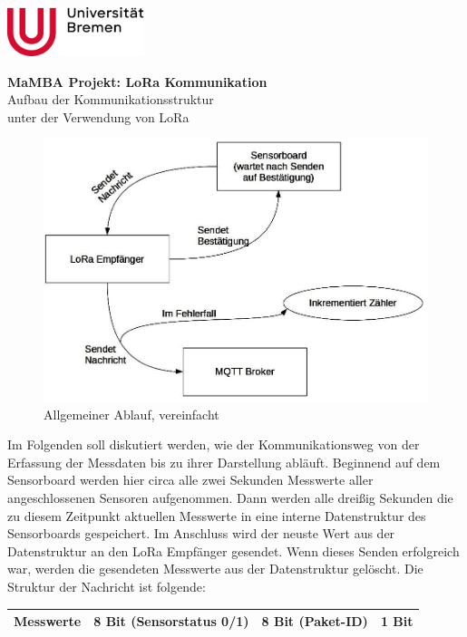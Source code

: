 \documentclass[a4paper, 12pt]{article}
\begin{document}
\begin{multicols}{2}
\includegraphics[width=0.3\textwidth]{bilder/Uni-Bremen_Logo.png}
\\
\end{multicols}
\begin{center}
{\LARGE\bfseries MaMBA Projekt: LoRa Kommunikation}
\\
{\Large Aufbau der Kommunikationsstruktur\\unter der Verwendung von LoRa}
\end{center}
\begin{figure}[h!]
\centering
\includegraphics[width=1\textwidth]{bilder/expl.jpg}
\caption{Allgemeiner Ablauf, vereinfacht}\label{abb:ablauf}
\end{figure}
Im Folgenden soll diskutiert werden, wie der Kommunikationsweg von der Erfassung der Messdaten bis zu ihrer Darstellung abläuft. Beginnend auf dem Sensorboard werden hier circa alle zwei Sekunden Messwerte aller angeschlossenen Sensoren aufgenommen. Dann werden alle dreißig Sekunden die zu diesem Zeitpunkt aktuellen Messwerte in eine interne Datenstruktur des Sensorboards gespeichert. Im Anschluss wird der neuste Wert aus der Datenstruktur an den LoRa Empfänger gesendet. Wenn dieses Senden erfolgreich war, werden die gesendeten Messwerte aus der Datenstruktur gelöscht. Die Struktur der Nachricht ist folgende:
\begin{table}[h!]
\centering
\begin{tabular}{|c|c|c|c|}
\hline
Messwerte 	&	8 Bit (Sensorstatus 0/1)	&	8 Bit (Paket-ID)	&	1 Bit\\ 
\hline
\end{tabular}
\end{table}\\
\end{document}
